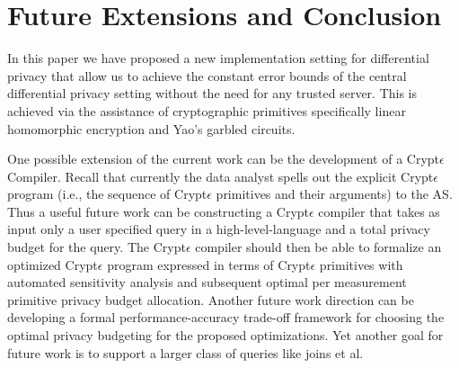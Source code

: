 
\section{Future Extensions and Conclusion}
In this paper we have proposed a new implementation setting for differential privacy that allow us to achieve the constant error bounds of the central differential privacy setting without the need for any trusted server. This is achieved via the assistance of cryptographic primitives specifically linear homomorphic encryption and Yao's garbled circuits. 
\par One possible extension of the current work can be the development of a
Crypt$\epsilon$ Compiler. Recall that currently the data analyst spells out the explicit Crypt$\epsilon$ program  (i.e., the sequence of Crypt$\epsilon$ primitives and their arguments) to the \textsf{AS}. Thus a useful future work can be constructing a Crypt$\epsilon$ compiler that takes as input only a user specified query in a high-level-language and a total privacy budget for the query. The Crypt$\epsilon$
compiler should then be able to formalize an optimized Crypt$\epsilon$ program expressed in terms of Crypt$\epsilon$ primitives with automated sensitivity analysis and subsequent optimal per measurement primitive privacy budget allocation. 
Another future work direction can be developing a formal performance-accuracy trade-off framework for choosing the optimal privacy budgeting for the proposed optimizations. Yet another goal for future work is to support a larger class of queries like joins et al.